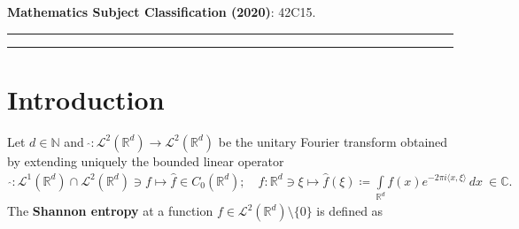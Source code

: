 \documentclass{amsart}
\begin{document}
\textbf{Mathematics Subject Classification (2020)}: 42C15.\\

\hrule


\tableofcontents
\hrule
\section{Introduction}

Let $d \in \mathbb{N}$ and  $~\widehat{}:\mathcal{L}^2 (\mathbb{R}^d) \to \mathcal{L}^2 (\mathbb{R}^d)$ be the unitary Fourier transform obtained by extending uniquely the bounded linear operator 
\begin{align*}
	\widehat{}:\mathcal{L}^1 (\mathbb{R}^d)\cap  \mathcal{L}^2	 (\mathbb{R}^d) \ni f \mapsto \widehat{f} \in  C_0(\mathbb{R}^d); \quad \widehat{f}: \mathbb{R}^d \ni \xi \mapsto \widehat{f}(\xi)\coloneqq \int\limits_{\mathbb{R}^d}	f(x)e^{-2\pi i  \langle x, \xi \rangle}\,dx\ \in \mathbb{C}.
\end{align*}
The  \textbf{Shannon entropy}  at a function  $f \in \mathcal{L}^2 (\mathbb{R}^d) \setminus \{0\}$ is defined as 
\end{document}
